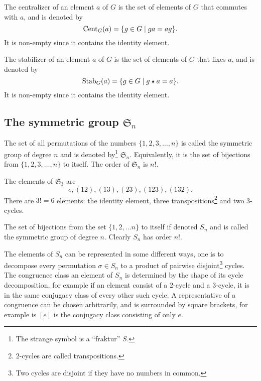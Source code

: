 		\begin{definition}[Centralizer]
			The centralizer of an element $a$ of $G$ is the set of elements of $G$ that commutes with $a$, and is denoted by 
			\[
			\text{Cent}_G(a) = \{ g \in G \mid ga = ag \}.
			\]
			It is non-empty since it contains the identity element.
		\end{definition}
		
		\begin{definition}[Stabilizer]
			The stabilizer of an element $a$ of $G$ is the set of elements of $G$ that fixes $a$, and is denoted by 
			\[
			\text{Stab}_G(a) = \{ g \in G \mid g \star a = a \}.
			\]
			It is non-empty since it contains the identity element.
		\end{definition}
		
	\subsection{The symmetric group $\mathfrak{S}_n$}
	
	The set of all permutations of the numbers $\{1,2,3,\dots,n\}$ is called the symmetric group of degree $n$ and is denoted by\footnote{The strange symbol is a ``fraktur'' $S$.} $\mathfrak{S}_n$. Equivalently, it is the set of bijections from $\{1,2,3,\dots,n\}$ to itself. The order of $\mathfrak{S}_n$ is $n!$. 
	
	\begin{example}
		The elements of $\mathfrak{S}_3$ are 
		\[
		e,(12),(13),(23),(123),(132).
		\]
		There are $3!=6$ elements: the identity element, three transpositions\footnote{2-cycles are called transpositions.} and two 3-cycles.
	\end{example}
	
	\begin{definition}
		The set of bijections from the set $\{1, 2, \dots n\}$ to itself if denoted $S_n$ and is called the symmetric group of degree $n$. Clearly $S_n$ has order $n!$.
	\end{definition}
	
	The elements of $S_n$ can be represented in some different ways, one is to decompose every permutation $\sigma \in S_n$ to a product of pairwise disjoint\footnote{Two cycles are disjoint if they have no numbers in common.} cycles. The congruence class an element of $S_n$ is determined by the shape of its cycle decomposition, for example if an element consist of a 2-cycle and a 3-cycle, it is in the same conjugacy class of every other such cycle. A representative of a congruence can be chosen arbitrarily, and is surrounded by square brackets, for example is $\left[ e \right]$ is the conjugacy class consisting of only $e$.
	
